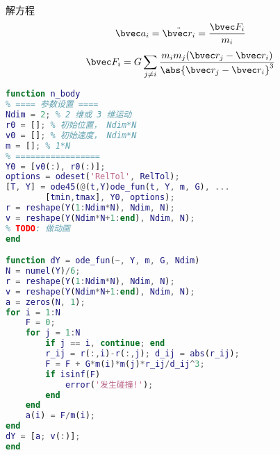 
\begin{issues}
\issueDraft
\end{issues}


解方程
\begin{equation}
\bvec a_i = \ddot{\bvec r_i} = \frac{\bvec F_i}{m_i}
\end{equation}
\begin{equation}
\bvec F_i = G\sum_{j\ne i} \frac{m_i m_j(\bvec r_j - \bvec r_i)}{\abs{\bvec r_j - \bvec r_i}^3}
\end{equation}

\begin{lstlisting}[language=matlab]
% N 体问题（支持二维或三维）
function n_body
% ==== 参数设置 ====
Ndim = 2; % 2 维或 3 维运动
r0 = []; % 初始位置， Ndim*N
v0 = []; % 初始速度， Ndim*N
m = []; % 1*N
% =================
Y0 = [v0(:), r0(:)];
options = odeset('RelTol', RelTol);
[T, Y] = ode45(@(t,Y)ode_fun(t, Y, m, G), ...
        [tmin,tmax], Y0, options);
r = reshape(Y(1:Ndim*N), Ndim, N);
v = reshape(Y(Ndim*N+1:end), Ndim, N);
% TODO: 做动画
end

function dY = ode_fun(~, Y, m, G, Ndim)
N = numel(Y)/6;
r = reshape(Y(1:Ndim*N), Ndim, N);
v = reshape(Y(Ndim*N+1:end), Ndim, N);
a = zeros(N, 1);
for i = 1:N
    F = 0;
    for j = 1:N
        if j == i, continue; end
        r_ij = r(:,i)-r(:,j); d_ij = abs(r_ij);
        F = F + G*m(i)*m(j)*r_ij/d_ij^3;
        if isinf(F)
            error('发生碰撞!');
        end
    end
    a(i) = F/m(i);
end
dY = [a; v(:)];
end
\end{lstlisting}

